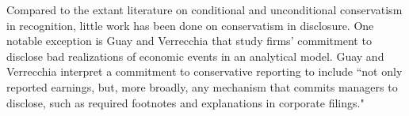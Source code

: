\documentclass[letterpaper,12pt]{article}
\begin{document}
\begin{spacing}{1.5}
Compared to the extant literature on conditional and unconditional conservatism in recognition, little work has been done on conservatism in disclosure. One notable exception is Guay and Verrecchia \citeyear{guayConservativeDisclosure2018} that study firms' commitment to disclose bad realizations of economic events in an analytical model. Guay and Verrecchia \citeyear[p. 73]{guayConservativeDisclosure2018} interpret a commitment to conservative reporting to include ``not only reported earnings, but, more broadly, any mechanism that commits managers to disclose, such as required footnotes and explanations in corporate filings."
\begin{comment}
	As \citeA[p. 243]{kothariManagersWithholdBad2009} state:
	\begin{adjustwidth}{1cm}{1cm}
	\begin{singlespace}
	\textit{Considerable research examines conservative} recognition \textit{in accounting in the United States and internationally (Basu [1997], Ball, Kothari, and Robin [2000], McNichols [1988]). However, there is little systematic evidence to suggest conservatism in firms’} disclosure \textit{practices, with the notable exception of disclosure of bad news to mitigate litigation risk.}
	\end{singlespace}
	\end{adjustwidth}
	In a recent analytical work, \citeA[pp. 73-74]{guayConservativeDisclosure2018} have expressed similar opinions:
	\begin{adjustwidth}{1cm}{1cm}
	\begin{singlespace}
	\textit{By way of an analogy, 20 years ago, much of the accounting literature on transparent financial disclosure emphasized constructs such as earnings timeliness, high-quality accruals, and asset/liability recognition. Today, scholars study a plethora of additional financial disclosure mechanisms, including management forecasts, conference calls, management discussion and analysis (MD\&A) disclosure, press releases, and social media outlets. A commitment to timely disclosure of bad news need not come exclusively through financial statement recognition, and we believe that a broader view of conservative disclosure will offer new paths forward for a literature that has struggled to develop theories to explain the efficiency of timely asymmetric earnings numbers. We encourage researchers to pursue these avenues to better understand how the very large literature on conservative financial reporting integrates with the equally large literature on corporate disclosure.}
	\end{singlespace}
	\end{adjustwidth}
\end{comment}



\end{spacing}
\end{document}
